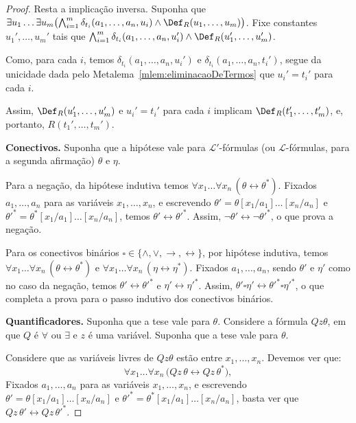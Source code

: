 \begin{proof}
    Resta a implicação inversa.
    Suponha que $\exists u_1\ldots \exists u_m\bigl(\bigwedge_{i=1}^m \delta_{t_i}(a_1,\ldots,a_n,u_i)\wedge \Def_R(u_1,\ldots,u_m)\bigr)$.
    Fixe constantes $u_1',\ldots,u_m'$ tais que $\bigwedge_{i=1}^m \delta_{t_i}(a_1,\ldots,a_n,u_i')\wedge \Def_R(u_1',\ldots,u_m')$.

    Como, para cada $i$, temos $\delta_{t_i}(a_1,\ldots,a_n,u_i')$ e
    $\delta_{t_i}(a_1,\ldots,a_n,t_i')$, segue da unicidade dada pelo
    Metalema~\ref{mlem:eliminacaoDeTermos} que $u_i'=t_i'$ para cada $i$.

    Assim, $\Def_R(u_1',\ldots,u_m')$ e $u_i'=t_i'$ para cada $i$ implicam $\Def_R(t_1',\ldots,t_m')$, e, portanto, $R(t_1',\ldots,t_m')$.

    \smallskip
    \textbf{Conectivos.}
    Suponha que a hipótese vale para $\mathcal L'$-fórmulas (ou $\mathcal L$-fórmulas, para a segunda afirmação) $\theta$ e $\eta$.

    Para a negação, da hipótese indutiva temos $\forall x_1\ldots \forall x_n\,(\theta\leftrightarrow \theta^\ast)$.
    Fixados $a_1,\ldots,a_n$ para as variáveis $x_1,\ldots,x_n$, e escrevendo $\theta'=\theta[x_1/a_1]\ldots[x_n/a_n]$ e $\theta'^\ast=\theta^\ast[x_1/a_1]\ldots[x_n/a_n]$, temos $\theta'\leftrightarrow \theta'^\ast$.
    Assim, $\neg\theta'\leftrightarrow \neg\theta'^\ast$, o que prova a negação.

    Para os conectivos binários $\square\in\{\wedge,\vee,\rightarrow,\leftrightarrow\}$,
    por hipótese indutiva, temos $\forall x_1\ldots \forall x_n\,(\theta\leftrightarrow \theta^\ast)$ e $\forall x_1\ldots \forall x_n\,(\eta\leftrightarrow \eta^\ast)$.
    Fixados $a_1,\ldots,a_n$, sendo $\theta'$ e $\eta'$ como no caso da negação, temos $\theta'\leftrightarrow \theta'^\ast$ e $\eta'\leftrightarrow \eta'^\ast$.
    Assim, $\theta'\square \eta'\leftrightarrow \theta'^\ast\square \eta'^\ast$, o que completa a prova para o passo indutivo dos conectivos binários.

    \smallskip
    \textbf{Quantificadores.}
    Suponha que a tese vale para $\theta$.
    Considere a fórmula $Qz\theta$, em que $Q$ é $\forall$ ou $\exists$ e $z$ é uma variável.
    Suponha que a tese vale para $\theta$.

    Considere que as variáveis livres de $Qz\theta$ estão entre $x_1,\ldots,x_n$.
    Devemos ver que:
    \[
        \forall x_1\ldots \forall x_n\,\bigl(Qz\,\theta\leftrightarrow Qz\,\theta^\ast\bigr),
    \]
    Fixados $a_1,\ldots,a_n$ para as variáveis $x_1,\ldots,x_n$, e escrevendo
    $\theta'=\theta[x_1/a_1]\ldots[x_n/a_n]$ e
    $\theta'^\ast=\theta^\ast[x_1/a_1]\ldots[x_n/a_n]$, basta ver que
    $Qz\,\theta'\leftrightarrow Qz\,\theta'^\ast$.


\end{proof}
